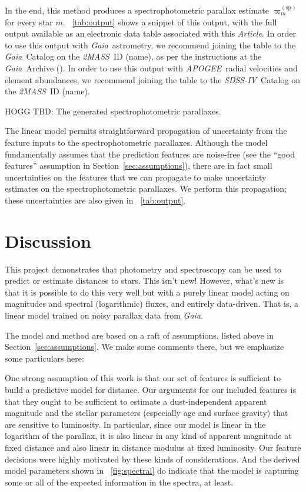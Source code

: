 \documentclass[modern]{aastex62}
\newcommand{\documentname}{\textsl{Article}}
\newcommand{\sectionname}{Section}
\newcommand{\acronym}[1]{{\small{#1}}}
\newcommand{\project}[1]{\textsl{#1}}
\newcommand{\apogee}{\project{\acronym{APOGEE}}}
\newcommand{\gaia}{\project{Gaia}}
\newcommand{\zmass}{\project{\acronym{2MASS}}}
\newcommand{\sdssiv}{\project{\acronym{SDSS-IV}}}
\newcommand{\sparallax}{\varpi^{(\mathrm{sp})}}
\begin{document}
In the end, this method produces a spectrophotometric parallax estimate $\sparallax_m$ for
every star $m$.
\tablename~\ref{tab:output} shows a snippet of this output, with the full output available
as an electronic data table associated with this \documentname.
In order to use this output with \gaia\ astrometry, we recommend joining the table to the
\gaia\ Catalog on the \zmass\ ID (name), as per the instructions at the \gaia\ Archive (\citealt{gaiaarchive}).
In order to use this output with \apogee\ radial velocities and element abundances, we recommend
joining the table to the \sdssiv\ Catalog on the \zmass\ ID (name).
\begin{table}
\caption{HOGG TBD: The generated spectrophotometric parallaxes.\label{tab:output}}
\end{table}

The linear model permits straightforward propagation of uncertainty from the
feature inputs to the spectrophotometric parallaxes.
Although the model fundamentally assumes that the prediction features are noise-free
(see the ``good features'' assumption in \sectionname~\ref{sec:assumptions}),
there are in fact small uncertainties on the features that we can propagate to 
make uncertainty estimates on the spectrophotometric parallaxes.
We perform this propagation; these uncertainties are also given in
\tablename~\ref{tab:output}.

\section{Discussion}

This project demonstrates that photometry and spectroscopy can be used to predict
or estimate distances to stars.
This isn't new!
However, what's new is that it is possible to do this very well but with a purely
linear model acting on magnitudes and spectral (logarithmic) fluxes, and entirely
data-driven.
That is, a linear model trained on noisy parallax data from \gaia.

The model and method are based on a raft of assumptions, listed above
in \sectionname~\ref{sec:assumptions}.
We make some comments there, but we emphasize some particulars here:

One strong assumption of this work is that our set of features is sufficient to
build a predictive model for distance.
Our arguments for our included features is that they ought to be sufficient to
estimate a dust-independent apparent magnitude and the stellar parameters (especially
age and surface gravity) that are sensitive to luminosity.
In particular, since our model is linear in the logarithm of the parallax, it is
also linear in any kind of apparent magnitude at fixed distance and also linear
in distance modulus at fixed luminosity.
Our feature decisions were highly motivated by these kinds of considerations.
And the derived model parameters shown in \figurename~\ref{fig:spectral} do indicate that
the model is capturing some or all of the expected information in the spectra, at least.
\end{document}
